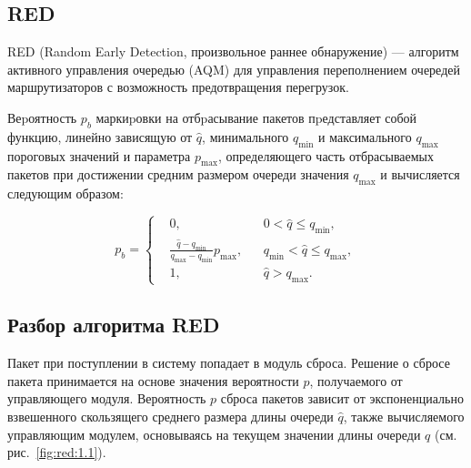 \subsection{RED}
\label{chap1:sec3:sub1}

RED \cite{red-1993} (Random Early Detection, произвольное раннее
обнаружение) --- алгоритм активного управления очередью (AQM) для
управления переполнением очередей маршрутизаторов с возможность
предотвращения перегрузок.

Веpоятность $p_{b}$ маркиpовки на отбpасывание пакетов пpедставляет
собой функцию, линейно зависящую от $\hat{q}$, минимального $q_{\min}$
и максимального $q_{\max}$ пороговых значений и параметра $p_{\max}$,
определяющего часть отбрасываемых пакетов при достижении средним
размером очереди значения $q_{\max}$ и вычисляется следующим образом:

\[
p_{b} = \left\{
  \begin{aligned}
& 0, &&    0 < \hat{q} \leqslant q_{\min}, \\
& \frac{\hat{q} - q_{\min}}{q_{\max} - q_{\min}} p_{\max}, &&  q_{\min} < \hat{q} \leqslant q_{\max} ,\\
& 1, &&   \hat{q} > q_{\max}. 
  \end{aligned}
\right.
\]

\subsection{Разбор алгоритма RED}
\label{chap1:sec3:sub2}

Пакет при поступлении в систему попадает в модуль сброса. Решение о
сбросе пакета принимается на основе значения вероятности $p$,
получаемого от управляющего модуля. Вероятность $p$ сброса пакетов
зависит от экспоненциально взвешенного скользящего среднего размера
длины очереди $\hat{q}$, также вычисляемого управляющим модулем,
основываясь на текущем значении длины очереди $q$ (см. рис.~\ref{fig:red:1.1}).

